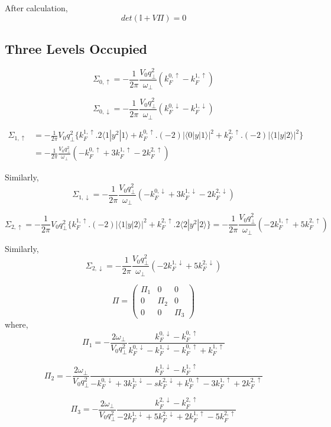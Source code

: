 After calculation,
\[ det(\mathbb{I}+V\Pi)=0 \]

\subsection{Three Levels Occupied}

\[\Sigma_{0,\uparrow}=-\frac{1}{2\pi} \frac{V_0 q_\perp^2}{\omega_{\perp}} (k_F^{0,\uparrow}-k_F^{1,\uparrow})\]

\[\Sigma_{0,\downarrow}=-\frac{1}{2\pi} \frac{V_0 q_\perp^2}{\omega_{\perp}} (k_F^{0,\downarrow}-k_F^{1,\downarrow})\]

\begin{align*}
\Sigma_{1,\uparrow} &=-\frac{1}{2\pi} V_0 q_\perp^2 \{k_F^{1,\uparrow}.2\langle 1|y^2|1\rangle + k_F^{0,\uparrow}.(-2) |\langle 0|y|1\rangle|^2 + k_F^{2,\uparrow}.(-2)|\langle 1|y|2\rangle|^2\} \\
 &= -\frac{1}{2\pi} \frac{V_0 q_\perp^2}{\omega_{\perp}} (-k_F^{0,\uparrow}+3k_F^{1,\uparrow}-2k_F^{2,\uparrow})
\end{align*}

Similarly, 
\[\Sigma_{1,\downarrow}=-\frac{1}{2\pi} \frac{V_0 q_\perp^2}{\omega_{\perp}} (-k_F^{0,\downarrow}+3k_F^{1,\downarrow}-2k_F^{2,\downarrow})\]

\[\Sigma_{2,\uparrow}=-\frac{1}{2\pi} V_0 q_\perp^2 \{k_F^{1,\uparrow}.(-2)|\langle 1|y|2\rangle|^2 + k_F^{2,\uparrow}.2\langle 2|y^2|2\rangle\} = -\frac{1}{2\pi} \frac{V_0 q_\perp^2}{\omega_{\perp}} (-2k_F^{1,\uparrow}+5k_F^{2,\uparrow})\]

Similarly,
\[\Sigma_{2,\downarrow}= -\frac{1}{2\pi} \frac{V_0 q_\perp^2}{\omega_{\perp}} (-2k_F^{1,\downarrow}+5k_F^{2,\downarrow})\]

\[\Pi=\left(
	\begin{matrix}
		\Pi_1 & 0 & 0\\
		0 & \Pi_2 & 0\\
		0 & 0 & \Pi_3 \end{matrix} \right) \]
where,
\[\Pi_1=-\frac{2\omega_{\perp}}{V_0 q_\perp^2} \frac{k_F^{0,\downarrow}-k_F^{0,\uparrow}}{k_F^{0,\downarrow}-k_F^{1,\downarrow}-k_F^{0,\uparrow}+k_F^{1,\uparrow}}\]

\[\Pi_2=-\frac{2\omega_{\perp}}{V_0 q_\perp^2} \frac{k_F^{1,\downarrow}-k_F^{1,\uparrow}}{-k_F^{0,\downarrow}+3k_F^{1,\downarrow}-sk_F^{2,\downarrow}+k_F^{0,\uparrow}-3k_F^{1,\uparrow}+2k_F^{2,\uparrow}}\]

\[\Pi_3=-\frac{2\omega_{\perp}}{V_0 q_\perp^2} \frac{k_F^{2,\downarrow}-k_F^{2,\uparrow}}{-2k_F^{1,\downarrow}+5k_F^{2,\downarrow}+2k_F^{1,\uparrow}-5k_F^{2,\uparrow}}\]

